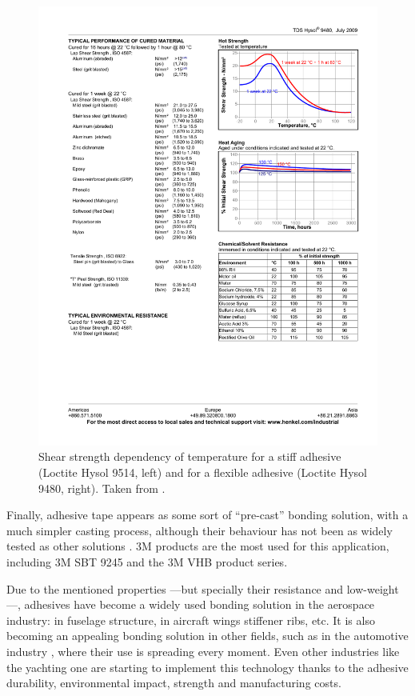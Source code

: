 \documentclass[
documentsize = a4, %
font = cmr, %
typesize = 11, %
printmode = true,
onehalfspacing = true,
language = en, %
titlepage = udciccp, %
degree = pt, %
dedication = true,
acknowledgements = true,
abstract-en = true,
abstract-es = false,
abstract-ga = false,
epigraphs = true,
toc = true,
lof = true,
lot = true,
frontmatterintoc = false,
notation = false,
minimal = false,
]{UDCthesis}
\begin{document}
\begin{figure}
\begin{minipage}[b]{.48\linewidth}
		\includegraphics[width=\linewidth]{IMG_CUTRES/loctite_hysol_9480_temp_dependency}
	\end{minipage}
	\caption[Shear strength dependency of temperature for a stiff adhesive (Loctite Hysol 9514, left) and for a flexible adhesive (Loctite Hysol 9480, right)]{Shear strength dependency of temperature for a stiff adhesive (Loctite Hysol 9514, left) and for a flexible adhesive (Loctite Hysol 9480, right). Taken from \citet{manufCatalog}.}
	\label{fig:loctite_hysol_temp_dependency}
\end{figure}

Finally, adhesive tape appears as some sort of ``pre-cast'' bonding solution, with a much simpler casting process, although their behaviour has not been as widely tested as other solutions \citep{Kadioglu2014}. 3M products are the most used for this application, including 3M SBT 9245 and the 3M VHB product series.

Due to the mentioned properties ---but specially their resistance and low-weight---, adhesives have become a widely used bonding solution in the aerospace industry: in fuselage structure, in aircraft wings stiffener ribs, etc. It is also becoming an appealing bonding solution in other fields, such as in the automotive industry \citep{Wu2006, Greve2007, Grant2009, Scattina2011, Kadioglu2014, SernaMoreno2015}, where their use is spreading every moment. Even other industries like the yachting one \citep{superyacht} are starting to implement this technology thanks to the adhesive durability, environmental impact, strength and manufacturing costs.
\end{document}
